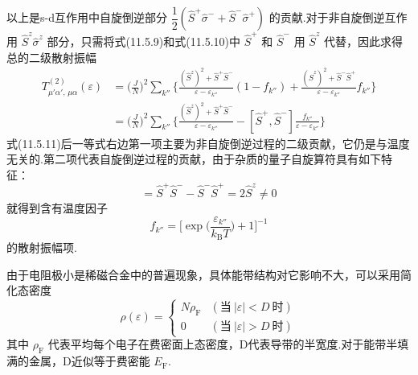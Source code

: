 以上是s-d互作用中自旋倒逆部分
$\dfrac{1}{2}(\hat{S}^{+}\hat{\sigma}^{-}+\hat{S}^{-}\hat{\sigma}^{+})$
的贡献.对于非自旋倒逆互作用 $\hat{S}^{z}\hat{\sigma}^{z}$ 部分，只需将式(11.5.9)和式(11.5.10)中 $\hat{S}^{+}$ 和 $\hat{S}^{-}$ 用 $\hat{S}^{z}$ 代替，因此求得总的二级散射振幅
\begin{equation}
\begin{aligned}
  T^{(2)}_{\mu'\alpha',\,\mu\alpha}(\varepsilon)
  &=\biggl(\frac{J}{N}\biggr)^{2}\sum_{k''}
  \biggl\{\frac{(\hat{S}^{z})^{2}+\hat{S}^{+}\hat{S}^{-}}
  {\varepsilon-\varepsilon_{k''}}(1-f_{k''})
  +\frac{(\hat{S}^{z})^{2}+\hat{S}^{-}\hat{S}^{+}}
  {\varepsilon-\varepsilon_{k''}}f_{k''}\biggr\}\\
  &=\biggl(\frac{J}{N}\biggr)^{2}\sum_{k''}
  \biggl\{\frac{(\hat{S}^{z})^{2}+\hat{S}^{+}\hat{S}^{-}}
  {\varepsilon-\varepsilon_{k''}}
  -[\hat{S}^{+},\hat{S}^{-}]\frac{f_{k''}}{\varepsilon-\varepsilon_{k''}}\biggr\}
\end{aligned}
\end{equation}
式(11.5.11)后一等式右边第一项主要为非自旋倒逆过程的二级贡献，它仍是与温度无关的.第二项代表自旋倒逆过程的贡献，由于杂质的量子自旋算符具有如下特征：
\begin{equation}
  [\hat{S}^{+},\hat{S}^{-}]
  =\hat{S}^{+}\hat{S}^{-}-\hat{S}^{-}\hat{S}^{+}
  =2\hat{S}^{z}\neq0
\end{equation}
就得到含有温度因子
\begin{equation*}
  f_{k''}=\biggl[\exp\biggl(\frac{\varepsilon_{k''}}{k_{\mathrm{B}}T}\biggr)+1\biggr]^{-1}
\end{equation*}
的散射振幅项.

由于电阻极小是稀磁合金中的普遍现象，具体能带结构对它影响不大，可以采用简化态密度
\begin{equation}
  \rho(\varepsilon)=
  \begin{cases}
    N\rho_{\mathrm{F}} & (\text{当}\ |\varepsilon|<D\ \text{时})\\
    0 & (\text{当}\ |\varepsilon|>D\ \text{时})
  \end{cases}
\end{equation}
其中 $\rho_{\mathrm{F}}$ 代表平均每个电子在费密面上态密度，D代表导带的半宽度.对于能带半填满的金属，D近似等于费密能 $E_{\mathrm{F}}$.

